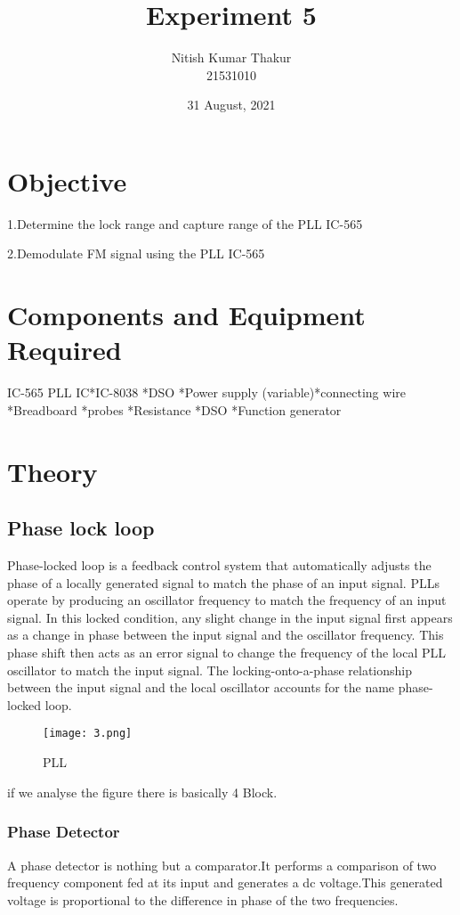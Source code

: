 \documentclass{article}
\title{Experiment 5}
\author{Nitish Kumar Thakur \\ 21531010 }
\date{31 August, 2021}
\begin{document}
\maketitle

\section{Objective}
1.Determine the lock range and capture range of the PLL IC-565 \par
2.Demodulate FM signal using the PLL IC-565
 
 \section{Components and Equipment Required}                    
 IC-565 PLL IC*IC-8038 *DSO *Power supply (variable)*connecting wire *Breadboard *probes *Resistance *DSO *Function generator
 
\section{Theory}

\subsection{Phase lock loop}
Phase-locked loop is a feedback control system that automatically adjusts the phase of a locally generated signal to match the phase of an input signal. PLLs operate by producing an oscillator frequency to match the frequency of an input signal. In this locked condition, any slight change in the input signal first appears as a change in phase between the input signal and the oscillator frequency. This phase shift then acts as an error signal to change the frequency of the local PLL oscillator to match the input signal. The locking-onto-a-phase relationship between the input signal and the local oscillator accounts for the name phase-locked loop.
\begin{figure*}[h]
	\centering
	\texttt{[image: 3.png]}
	\caption{PLL}
	\label{FBD}
\end{figure*}
if we analyse the figure there is basically 4 Block.
\subsubsection{Phase Detector}
A phase detector is nothing but a comparator.It performs a comparison of two frequency component fed at its input and generates a dc voltage.This generated voltage is proportional to the difference in phase of the two frequencies.
\end{document}
